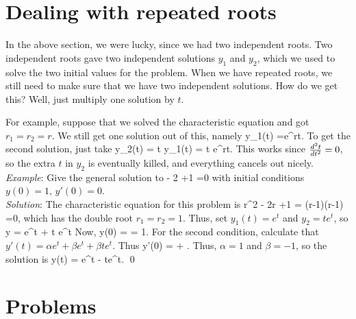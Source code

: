 \documentclass[12pt]{book}
\begin{document}
\section{Dealing with repeated roots}
In the above section, we were lucky, since we had two independent roots.
Two independent roots gave two independent solutions $y_1$ and $y_2$, which
we used to solve the two initial values for the problem. When we have
repeated roots, we still need to make sure that we have two independent
solutions. How do we get this? Well, just multiply one solution by $t$.

For example, suppose that we solved the characteristic equation and got
$r_1=r_2=r$. We still get one solution out of this, namely
\bee
y_1(t) =e^{rt}.
\eee
To get the second solution, just take
\bee
y_2(t) = t y_1(t) = t e^{rt}.
\eee
This works since $\frac{d^2 t}{d t^2}=0$, so the extra $t$ in $y_2$ is eventually
killed, and everything cancels out nicely.
\\

\noindent\emph{Example}: Give the general solution to
\bee
{} - 2 +1 =0
\eee
with initial conditions $y(0) =1, \, y'(0) =0.$\\
\noindent\emph{Solution}:
The characteristic equation for this problem is
\bee
r^2 - 2r +1 = (r-1)(r-1) =0,
\eee
which has the double root $r_1=r_2=1$. Thus, set
$y_1(t) = e^t$ and $y_2=t e^t$, so
\bee
y = \alpha e^t + \beta t e^t
\eee
Now,
\bee
y(0) = \alpha = 1.
\eee
For the second condition, calculate that
$y'(t) = \alpha e^t + \beta e^t + \beta te^t$. Thus
\bee
y'(0) = \alpha + .
\eee
Thus, $\alpha=1$ and $\beta =-1$, so the solution is
\bee
y(t) = e^t - te^t. \qed
\eee


\section{Problems}
\end{document}
